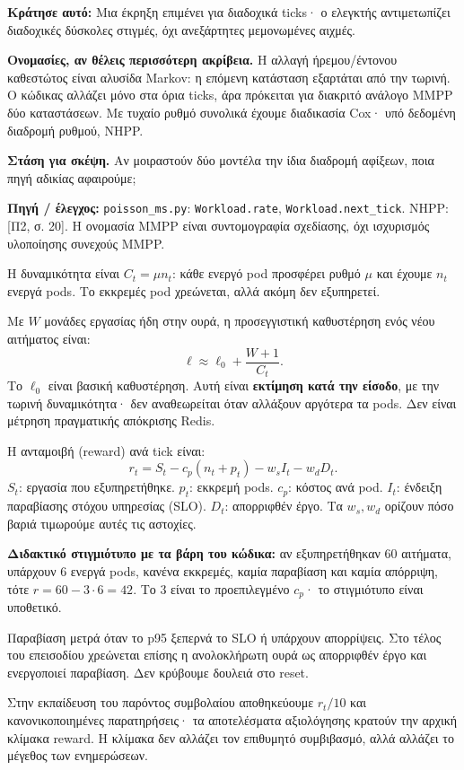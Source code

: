 \documentclass[11pt,a4paper]{article}
\newcommand{\page}[2]{\clearpage\pdfbookmark[0]{#1}{topic\thepage}{\sffamily\color{ink}\LARGE #1\par}\vspace{3pt}{\sffamily\large #2\par}\vspace{8pt}}
\newcommand{\idea}[1]{\par\noindent\colorbox{soft}{\parbox{\dimexpr\linewidth-2\fboxsep}{\textbf{Κράτησε αυτό:} #1}}\par}
\newcommand{\think}[1]{\par\textbf{Στάση για σκέψη.} #1}
\newcommand{\src}[1]{\vfill{\footnotesize\color{ink}\textbf{Πηγή / έλεγχος:} #1\par}}
\newcommand{\code}[1]{{\footnotesize\nolinkurl{#1}}}
\begin{document}
\idea{Μια έκρηξη επιμένει για διαδοχικά ticks· ο ελεγκτής αντιμετωπίζει διαδοχικές δύσκολες στιγμές, όχι ανεξάρτητες μεμονωμένες αιχμές.}
\textbf{Ονομασίες, αν θέλεις περισσότερη ακρίβεια.} Η αλλαγή ήρεμου/έντονου καθεστώτος είναι αλυσίδα Markov: η επόμενη κατάσταση εξαρτάται από την τωρινή. Ο κώδικας αλλάζει μόνο στα όρια ticks, άρα πρόκειται για διακριτό ανάλογο MMPP δύο καταστάσεων. Με τυχαίο ρυθμό συνολικά έχουμε διαδικασία Cox· υπό δεδομένη διαδρομή ρυθμού, NHPP.

\think{Αν μοιραστούν δύο μοντέλα την ίδια διαδρομή αφίξεων, ποια πηγή αδικίας αφαιρούμε;}
\src{\code{poisson_ms.py}: \code{Workload.rate}, \code{Workload.next_tick}. NHPP: [Π2, σ. 20]. Η ονομασία MMPP είναι συντομογραφία σχεδίασης, όχι ισχυρισμός υλοποίησης συνεχούς MMPP.}

\page{4 · Τι ανταμείβουμε;}{Από την ουρά σε έναν στόχο μάθησης}
Η δυναμικότητα είναι $C_t=\mu n_t$: κάθε ενεργό pod προσφέρει ρυθμό $\mu$ και έχουμε $n_t$ ενεργά pods. Το εκκρεμές pod χρεώνεται, αλλά ακόμη δεν εξυπηρετεί.

Με $W$ μονάδες εργασίας ήδη στην ουρά, η προσεγγιστική καθυστέρηση ενός νέου αιτήματος είναι:
\[
 \ell\approx\ell_0+\frac{W+1}{C_t}.
\]
Το $\ell_0$ είναι βασική καθυστέρηση. Αυτή είναι \textbf{εκτίμηση κατά την είσοδο}, με την τωρινή δυναμικότητα· δεν αναθεωρείται όταν αλλάξουν αργότερα τα pods. Δεν είναι μέτρηση πραγματικής απόκρισης Redis.

Η ανταμοιβή (reward) ανά tick είναι:
\[
 r_t=S_t-c_p(n_t+p_t)-w_s I_t-w_d D_t.
\]
$S_t$: εργασία που εξυπηρετήθηκε. $p_t$: εκκρεμή pods. $c_p$: κόστος ανά pod. $I_t$: ένδειξη παραβίασης στόχου υπηρεσίας (SLO). $D_t$: απορριφθέν έργο. Τα $w_s,w_d$ ορίζουν πόσο βαριά τιμωρούμε αυτές τις αστοχίες.

\textbf{Διδακτικό στιγμιότυπο με τα βάρη του κώδικα:} αν εξυπηρετήθηκαν $60$ αιτήματα, υπάρχουν $6$ ενεργά pods, κανένα εκκρεμές, καμία παραβίαση και καμία απόρριψη, τότε $r=60-3\cdot6=42$. Το $3$ είναι το προεπιλεγμένο $c_p$· το στιγμιότυπο είναι υποθετικό.

Παραβίαση μετρά όταν το p95 ξεπερνά το SLO ή υπάρχουν απορρίψεις. Στο τέλος του επεισοδίου χρεώνεται επίσης η ανολοκλήρωτη ουρά ως απορριφθέν έργο και ενεργοποιεί παραβίαση. Δεν κρύβουμε δουλειά στο reset.

Στην εκπαίδευση του παρόντος συμβολαίου αποθηκεύουμε $r_t/10$ και κανονικοποιημένες παρατηρήσεις· τα αποτελέσματα αξιολόγησης κρατούν την αρχική κλίμακα reward. Η κλίμακα δεν αλλάζει τον επιθυμητό συμβιβασμό, αλλά αλλάζει το μέγεθος των ενημερώσεων.
\end{document}
